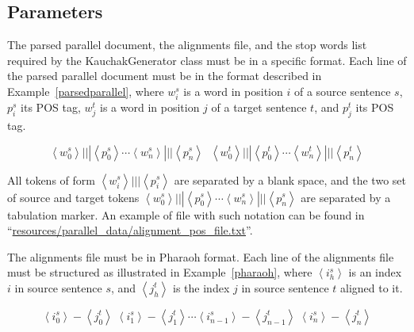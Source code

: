 \subsection{Parameters}

The parsed parallel document, the alignments file, and the stop words list required by the KauchakGenerator class must be in a specific format. Each line of the parsed parallel document must be in the format described in Example~\ref{parsedparallel}, where $w_{i}^{s}$ is a word in position $i$ of a source sentence $s$, $p_{i}^{s}$ its POS tag, $w_{j}^{t}$ is a word in position $j$ of a target sentence $t$, and $p_{j}^{t}$ its POS tag.

\begin{equation}
\label{parsedparallel}
\left \langle w_{0}^{s} \right \rangle\! |||\! \left \langle p_{0}^{s} \right \rangle\cdots\left \langle w_{n}^{s} \right \rangle\!|||\!\left \langle p_{n}^{s} \right \rangle \;\; \left \langle w_{0}^{t} \right \rangle\! |||\! \left \langle p_{0}^{t} \right \rangle\cdots\left \langle w_{n}^{t} \right \rangle\!|||\!\left \langle p_{n}^{t} \right \rangle
\end{equation}

All tokens of form $\left \langle w_{i}^{s} \right \rangle\! |||\! \left \langle p_{i}^{s} \right \rangle$ are separated by a blank space, and the two set of source and target tokens $\left \langle w_{0}^{s} \right \rangle\! |||\! \left \langle p_{0}^{s} \right \rangle\cdots\left \langle w_{n}^{s} \right \rangle\!|||\!\left \langle p_{n}^{s} \right \rangle$ are separated by a tabulation marker. An example of file with such notation can be found in ``\url{resources/parallel_data/alignment_pos_file.txt}''.

The alignments file must be in Pharaoh format. Each line of the alignments file must be structured as illustrated in Example~\ref{pharaoh}, where $\left \langle i_{h}^{s} \right \rangle$ is an index $i$ in source sentence $s$, and $\left \langle j_{h}^{t} \right \rangle$ is the index $j$ in source sentence $t$ aligned to it.

\begin{equation}
\label{pharaoh}
\left \langle i_{0}^{s} \right \rangle\! -\! \left \langle j_{0}^{t} \right \rangle\; \left \langle i_{1}^{s} \right \rangle\! -\! \left \langle j_{1}^{t} \right \rangle\cdots\left \langle i_{n-1}^{s} \right \rangle\! -\! \left \langle j_{n-1}^{t} \right \rangle\; \left \langle i_{n}^{s} \right \rangle\! -\! \left \langle j_{n}^{t} \right \rangle
\end{equation}

